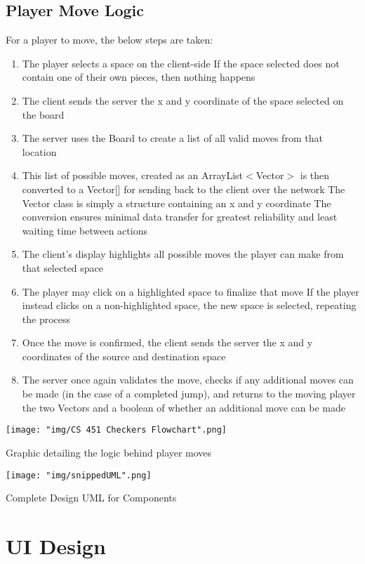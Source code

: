 \documentclass{scrreprt}
\begin{document}
	\section{Player Move Logic}
		For a player to move, the below steps are taken:
		\begin{enumerate} [label*=\arabic*.]
		\item The player selects a space on the client-side
			\subitem If the space selected does not contain one of their own pieces, then nothing happens
		\item The client sends the server the x and y coordinate of the space selected on the board
		\item The server uses the Board to create a list of all valid moves from that location
		\item This list of possible moves, created as an ArrayList$<$Vector$>$ is then converted to a Vector[] for sending back to the client over the network
			\subitem The Vector class is simply a structure containing an x and y coordinate
			\subitem The conversion ensures minimal data transfer for greatest reliability and least waiting time between actions
		\item The client's display highlights all possible moves the player can make from that selected space
		\item The player may click on a highlighted space to finalize that move
			\subitem If the player instead clicks on a non-highlighted space, the new space is selected, repeating the process
		\item Once the move is confirmed, the client sends the server the x and y coordinates of the source and destination space
		\item The server once again validates the move, checks if any additional moves can be made (in the case of a completed jump), and returns to the moving player the two Vectors and a boolean of whether an additional move can be made
		\end{enumerate}
	
		\texttt{[image: "img/CS 451 Checkers Flowchart".png]}	

		Graphic detailing the logic behind player moves

		\texttt{[image: "img/snippedUML".png]}

		Complete Design UML for Components

\chapter{UI Design}
\end{document}
